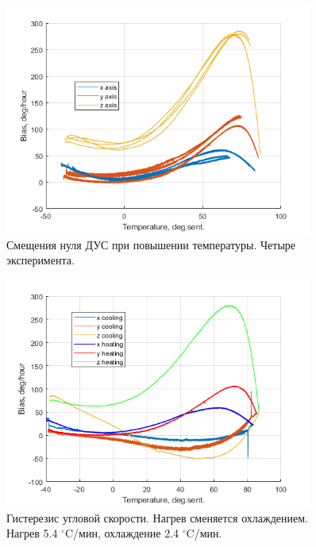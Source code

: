 \documentclass[a4paper,12pt]{article}
\begin{document}
\begin{figure}[hp!]
\centering
\includegraphics[width=0.9\textwidth]{four_graphs.png} 
\caption{\label{fig:four_exps} Смещения нуля ДУС при повышении температуры. Четыре эксперимента.}
\end{figure}
\begin{figure}[hp!]
\centering
\includegraphics[width=0.9\textwidth]{hysteresis.png} 
\caption{\label{fig:hyst} Гистерезис угловой скорости. Нагрев сменяется охлаждением. Нагрев 5.4 $^{\circ}$C/мин, охлаждение 2.4 $^{\circ}$C/мин.}
\end{figure}
\end{document}
